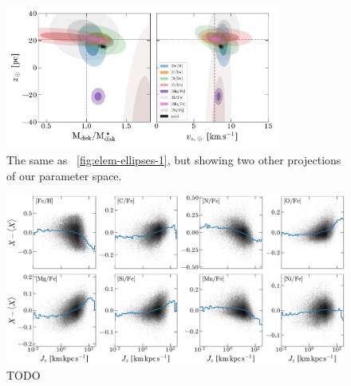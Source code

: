\documentclass[modern]{aastex63}
\begin{document}
\begin{figure}[!tp]
  \begin{mdframed}
  \begin{center}
  \includegraphics[width=0.8\textwidth]{M-z-vz-z-error-ellipses.pdf}
  \end{center}
  \caption{%
  The same as \figurename~\ref{fig:elem-ellipses-1}, but showing two other
  projections of our parameter space.
  \label{fig:elem-ellipses-2}
  }
  \end{mdframed}
\end{figure}

\begin{figure}[!tp]
  \begin{mdframed}
  \begin{center}
  \includegraphics[width=\textwidth]{elem-Jz-gradients.pdf}
  \end{center}
  \caption{%
    TODO
  \label{fig:elem-Jz-gradients}
  }
  \end{mdframed}
\end{figure}
\end{document}
